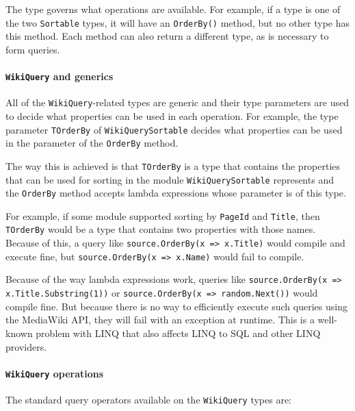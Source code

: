 The type governs what operations are available.
For example, if a type is one of the two \lstinline{Sortable} types,
it will have an \lstinline{OrderBy()} method, but no other type has this method.
Each method can also return a different type, as is necessary to form queries.

\paragraph{\lstinline{WikiQuery} and generics}

All of the \lstinline{WikiQuery}-related types are generic
and their type parameters are used to decide what properties can be used in each operation.
For example, the type parameter \lstinline{TOrderBy} of \lstinline{WikiQuerySortable}
decides what properties can be used in the parameter of the \lstinline{OrderBy} method.

The way this is achieved is that \lstinline{TOrderBy} is a type that contains the properties that can be
used for sorting in the module \lstinline{WikiQuerySortable} represents
and the \lstinline{OrderBy} method accepts lambda expressions whose parameter is of this type.

For example, if some module supported sorting by \lstinline{PageId} and \lstinline{Title},
then \lstinline{TOrderBy} would be a type that contains two properties with those names.
Because of this, a query like \lstinline{source.OrderBy(x => x.Title)} would compile and execute fine,
but \lstinline{source.OrderBy(x => x.Name)} would fail to compile.

Because of the way lambda expressions work, queries like \lstinline[breaklines=true]{source.OrderBy(x => x.Title.Substring(1))} or \lstinline{source.OrderBy(x => random.Next())} would compile fine.
But because there is no way to efficiently execute such queries using the MediaWiki \ac{API},
they will fail with an exception at runtime.
This is a well-known problem with LINQ that also affects LINQ to SQL \cite{linq-to-sql-functions}
and other LINQ providers.

\paragraph{\lstinline{WikiQuery} operations}

The standard query operators available on the \lstinline{Wiki}\lstBreak\lstinline{Query} types are:

